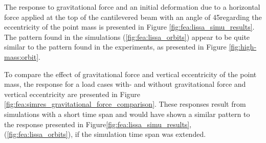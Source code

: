 \documentclass{article}
\begin{document}
The response to gravitational force and an initial deformation due to a horizontal force applied at the top of the  cantilevered beam with an angle of 45\textdegree regarding the eccentricity of the point mass is presented in Figure \autoref{fig:fea:lissa_simu_results}. The pattern found in the simulations (\autoref{fig:fea:lissa_orbits}) appear to be quite similar to the pattern found in the experiments, as presented in Figure \autoref{fig:high-mass:orbit}.

To compare the effect of gravitational force and vertical eccentricity of the point mass, the response  for a load cases with- and without gravitational force and vertical eccentricity are presented in Figure \autoref{fig:fea:simres_gravitational_force_comparison}. These responses result from simulations with a short time span and would have shown a similar pattern to the response presented in Figure\autoref{fig:fea:lissa_simu_results}, (\autoref{fig:fea:lissa_orbits}), if the simulation time span was extended. 
\end{document}
